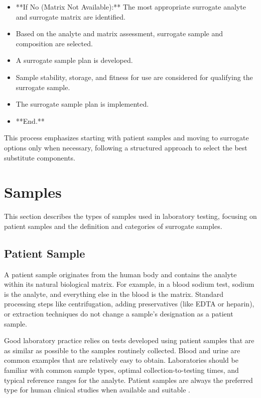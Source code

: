 \documentclass{article}
\begin{document}
\begin{itemize}
    \item **If No (Matrix Not Available):** The most appropriate surrogate analyte and surrogate matrix are identified.
    \item Based on the analyte and matrix assessment, surrogate sample and composition are selected.
    \item A surrogate sample plan is developed.
    \item Sample stability, storage, and fitness for use are considered for qualifying the surrogate sample.
    \item The surrogate sample plan is implemented.
    \item **End.**
\end{itemize}

This process emphasizes starting with patient samples and moving to surrogate options only when necessary, following a structured approach to select the best substitute components.

\section{Samples}

This section describes the types of samples used in laboratory testing, focusing on patient samples and the definition and categories of surrogate samples.

\subsection{Patient Sample}

A patient sample originates from the human body and contains the analyte within its natural biological matrix. For example, in a blood sodium test, sodium is the analyte, and everything else in the blood is the matrix. Standard processing steps like centrifugation, adding preservatives (like EDTA or heparin), or extraction techniques do not change a sample's designation as a patient sample.

Good laboratory practice relies on tests developed using patient samples that are as similar as possible to the samples routinely collected. Blood and urine are common examples that are relatively easy to obtain. Laboratories should be familiar with common sample types, optimal collection-to-testing times, and typical reference ranges for the analyte. Patient samples are always the preferred type for human clinical studies when available and suitable \cite{CLSIEP39Ed1E}.
\end{document}
